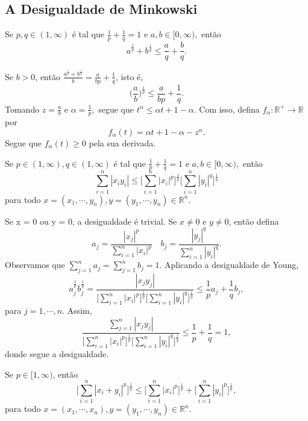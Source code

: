 \documentclass[MetricSpaces/metric_notes.tex]{subfiles}
\begin{document}
\subsection{A Desigualdade de Minkowski}
\begin{lemma*}
	Se \(p, q\in (1, \infty)\) é tal que \(\frac{1}{p} + \frac{1}{q} = 1\) e \(a, b\in [0, \infty),\) então
	\[
		a^{\frac{1}{p}} + b^{\frac{1}{q}}\leq \frac{a}{q} + \frac{b}{q}.
	\]
\end{lemma*}
\begin{proof*}
	Se \(b > 0\), então \(\frac{a^{\frac{1}{p}}+b^{\frac{1}{q}}}{b} = \frac{a}{bp} + \frac{1}{q}\), isto é,
	\[
		\biggl(\frac{a}{b}\biggr)^{\frac{1}{p}}\leq \frac{a}{bp} + \frac{1}{q}.
	\]
	Tomando \(z=\frac{a}{b}\) e \(\alpha =\frac{1}{p},\) segue que \(t^{\alpha }\leq \alpha t + 1 - \alpha.\) Com isso, defina
	\(f_{\alpha }:\mathbb{R}^{+}\rightarrow \mathbb{R}\) por
	\[
		f_{\alpha }(t) = \alpha t +1 - \alpha - z^{\alpha }.
	\]
	Segue que \(f_{\alpha }(t)\geq 0\) pela sua derivada. \qedsymbol
\end{proof*}
\begin{lemma*}
	Se \(p\in(1, \infty), q\in (1, \infty)\) é tal que \(\frac{1}{p}+\frac{1}{q}=1\) e \(a, b\in [0, \infty),\) então
	\[
		\sum\limits_{i=1}^{n}|x_{i}y_{i}|\leq \biggl[\sum\limits_{i=1}^{n}|x_{i}|^{p}\biggr]^{\frac{1}{p}}\biggl[\sum\limits_{i=1}^{n}|y_{i}|^{q}\biggr]^{\frac{1}{q}}
	\]
	para todo \(x=(x_{1}, \cdots, y_{n}), y=(y_{1}, \cdots, y_{n}) \in \mathbb{R}^{n}.\)
\end{lemma*}
\begin{proof*}
	Se x = 0 ou y = 0, a desigualdade é trivial. Se \(x\neq0\) e \(y\neq0\), então defina
	\[
		a_{j} = \frac{|x_{j}|^{p}}{\sum\limits_{i=1}^{n}|x_{i}|^{p}}\quad b_{j}=\frac{|y_{j}|^{q}}{\sum\limits_{i=1}^{n}|y_{i}|^{q}}.
	\]
	Observamos que \(\sum\limits_{j=1}^{n}a_{j} = \sum\limits_{j=1}^{n}b_{j}=1.\) Aplicando a desigualdade de Young,
	\[
		a_{j}^{\frac{1}{p}}b_{j}^{\frac{1}{q}} = \frac{|x_{j}y_{j}|}{\biggl[\sum\limits_{i=1}^{n}|x_{i}|^{p}\biggr]^{\frac{1}{p}}\biggl[\sum\limits_{i=1}^{n}|y_{i}|^{q}\biggr]^{\frac{1}{q}}}\leq \frac{1}{p}a_{j} + \frac{1}{q}b_{j},
	\]
	para \(j=1, \cdots, n.\) Assim,
	\[
		\frac{\sum\limits_{j=1}^{n}|x_{j}y_{j}|}{\biggl[\sum\limits_{i=1}^{n}|x_{i}|^{p}\biggr]^{\frac{1}{p}}\biggl[\sum\limits_{i=1}^{n}|y_{i}|^{q}\biggr]^{\frac{1}{q}}}\leq \frac{1}{p} + \frac{1}{q}=1,
	\]
	donde segue a desigualdade. \qedsymbol
\end{proof*}
\begin{prop*}
	Se \(p\in[1, \infty)\), então
	\[
		\biggl[\sum\limits_{i=1}^{n}|x_{i}+y_{i}|^{p}\biggr]^{\frac{1}{p}}\leq \biggl[\sum\limits_{i=1}^{n}|x_{i}|^{p}\biggr]^{\frac{1}{p}} + \biggl[\sum\limits_{i=1}^{n}|y_{i}|^{p}\biggr]^{\frac{1}{p}},
	\]
	para todo \(x=(x_{1}, \cdots, x_{n}), y=(y_{1}, \cdots, y_{n})\in \mathbb{R}^{n}\).
\end{prop*}
\end{document}
